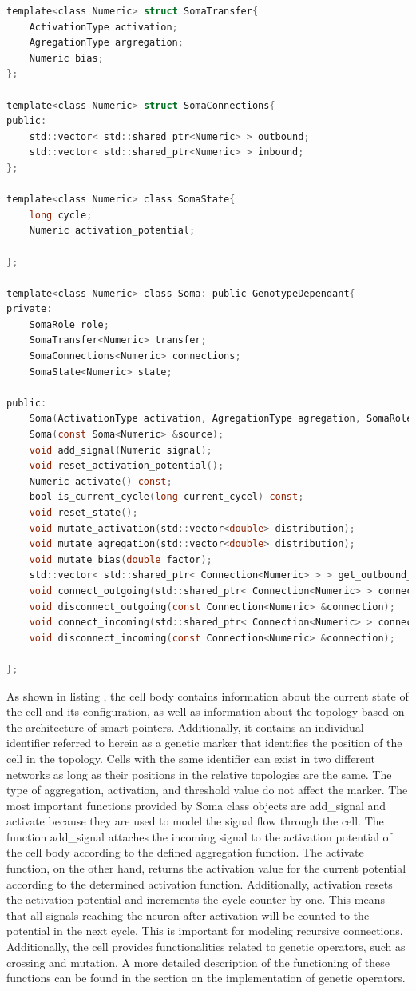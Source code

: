 \begin{lstlisting}[language=C]
template<class Numeric> struct SomaTransfer{
	ActivationType activation; 
	AgregationType argregation;
	Numeric bias; 
};

template<class Numeric> struct SomaConnections{
public:
	std::vector< std::shared_ptr<Numeric> > outbound;
	std::vector< std::shared_ptr<Numeric> > inbound;
};

template<class Numeric> class SomaState{
	long cycle;
	Numeric activation_potential;

};

template<class Numeric> class Soma: public GenotypeDependant{
private:
	SomaRole role;
	SomaTransfer<Numeric> transfer;
	SomaConnections<Numeric> connections;
	SomaState<Numeric> state;

public:
	Soma(ActivationType activation, AgregationType agregation, SomaRole role, Numeric bias);
	Soma(const Soma<Numeric> &source);
	void add_signal(Numeric signal);
	void reset_activation_potential();
	Numeric activate() const;
	bool is_current_cycle(long current_cycel) const;
	void reset_state();
	void mutate_activation(std::vector<double> distribution);
	void mutate_agregation(std::vector<double> distribution);
	void mutate_bias(double factor);
	std::vector< std::shared_ptr< Connection<Numeric> > > get_outbound_connections() const;
	void connect_outgoing(std::shared_ptr< Connection<Numeric> > connection);
	void disconnect_outgoing(const Connection<Numeric> &connection);
	void connect_incoming(std::shared_ptr< Connection<Numeric> > connection);
	void disconnect_incoming(const Connection<Numeric> &connection);

};
\end{lstlisting}

As shown in listing , the cell body contains information about the current state of the cell and 
its configuration, as well as information about the topology based on the architecture of 
smart pointers.
Additionally, it contains an individual identifier referred to herein as a genetic marker that 
identifies the position of the cell in the topology. Cells with the same identifier can exist in 
two different networks as long as their positions in the relative topologies are the same. 
The type of aggregation, activation, and threshold value do not affect the marker.
The most important functions provided by Soma class objects are add\_signal and activate because 
they are used to model the signal flow through the cell. 
The function add\_signal attaches the incoming signal to the activation potential of the cell 
body according to the defined aggregation function. The activate function, on the other hand, 
returns the activation value for the current potential according to the determined activation 
function. 
Additionally, activation resets the activation potential and increments the cycle counter by one. 
This means that all signals reaching the neuron after activation will be counted to the potential 
in the next cycle.  This is important for modeling recursive connections.
Additionally, the cell provides functionalities related to genetic operators, such as crossing 
and mutation. 
A more detailed description of the functioning of these functions can be found in the section on 
the implementation of genetic operators.

